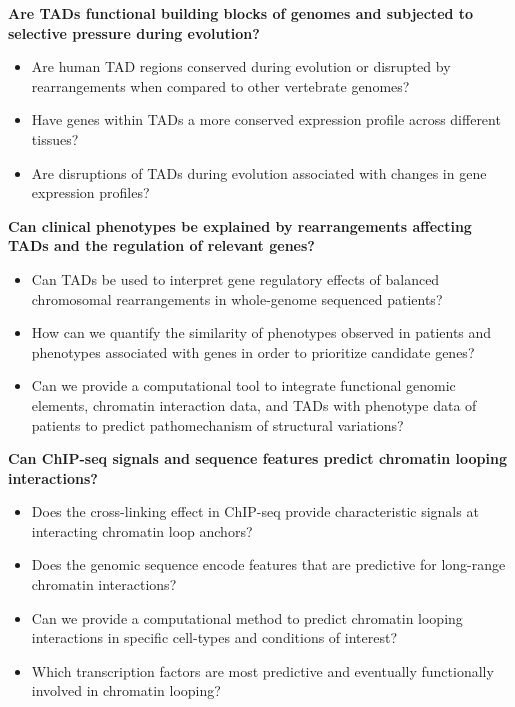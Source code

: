 \documentclass[a4paper,twoside=true,openright,parskip=full,chapterprefix=true,11pt,headings=normal,bibliography=totoc,listof=totoc,titlepage=on,captions=tableabove,draft=false]{scrreprt}
\providecommand{\tightlist}{%
  \setlength{\itemsep}{0pt}\setlength{\parskip}{0pt}}
\theoremstyle{definition}
\theoremstyle{definition}
\theoremstyle{definition}
\theoremstyle{remark}
\begin{document}
\textbf{Are TADs functional building blocks of genomes and subjected to
selective pressure during evolution?}

\begin{itemize}
\tightlist
\item
  Are human TAD regions conserved during evolution or disrupted by
  rearrangements when compared to other vertebrate genomes?
\item
  Have genes within TADs a more conserved expression profile across
  different tissues?
\item
  Are disruptions of TADs during evolution associated with changes in
  gene expression profiles?
\end{itemize}

\textbf{Can clinical phenotypes be explained by rearrangements affecting
TADs and the regulation of relevant genes?}

\begin{itemize}
\tightlist
\item
  Can TADs be used to interpret gene regulatory effects of balanced
  chromosomal rearrangements in whole-genome sequenced patients?
\item
  How can we quantify the similarity of phenotypes observed in patients
  and phenotypes associated with genes in order to prioritize candidate
  genes?
\item
  Can we provide a computational tool to integrate functional genomic
  elements, chromatin interaction data, and TADs with phenotype data of
  patients to predict pathomechanism of structural variations?
\end{itemize}

\textbf{Can ChIP-seq signals and sequence features predict chromatin
looping interactions?}

\begin{itemize}
\tightlist
\item
  Does the cross-linking effect in ChIP-seq provide characteristic
  signals at interacting chromatin loop anchors?
\item
  Does the genomic sequence encode features that are predictive for
  long-range chromatin interactions?
\item
  Can we provide a computational method to predict chromatin looping
  interactions in specific cell-types and conditions of interest?
\item
  Which transcription factors are most predictive and eventually
  functionally involved in chromatin looping?
\end{itemize}
\end{document}
